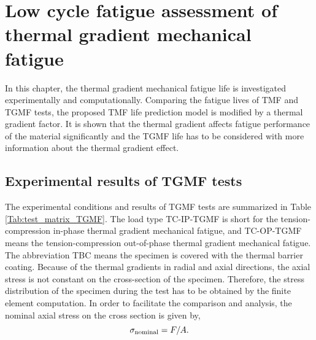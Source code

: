 \chapter{Low cycle fatigue assessment of thermal gradient mechanical fatigue}

\noindent
In this chapter, the thermal gradient mechanical fatigue life is investigated experimentally and computationally.
Comparing the fatigue lives of TMF and TGMF tests, the proposed TMF life prediction model is modified by a thermal gradient factor.
It is shown that the thermal gradient affects fatigue performance of the material significantly and the TGMF life has to be considered with more information about the thermal gradient effect.

\section{Experimental results of TGMF tests}
\noindent
The experimental conditions and results of TGMF tests are summarized in Table \ref{Tab:test_matrix_TGMF}. The load type TC-IP-TGMF is short for the tension-compression in-phase thermal gradient mechanical fatigue, and TC-OP-TGMF means the tension-compression out-of-phase thermal gradient mechanical fatigue. The abbreviation TBC means the specimen is covered with the thermal barrier coating.
Because of the thermal gradients in radial and axial directions, the axial stress is not constant on the cross-section of the specimen.
Therefore, the stress distribution of the specimen during the test has to be obtained by the finite element computation.
In order to facilitate the comparison and analysis, the nominal axial stress on the cross section is given by,
\[\sigma_{\rm{nominal}} = F/A.\]

